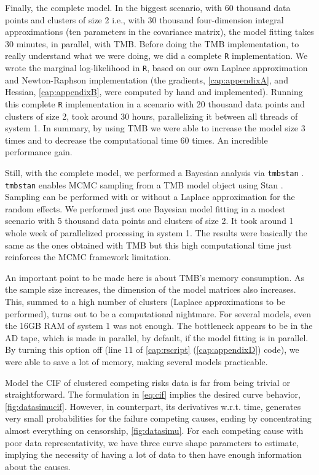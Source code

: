 Finally, the complete model. In the biggest scenario, with 60 thousand
data points and clusters of size 2 i.e., with 30 thousand four-dimension
integral approximations (ten parameters in the covariance matrix), the
model fitting takes 30 minutes, in parallel, with TMB. Before doing the
TMB implementation, to really understand what we were doing, we did a
complete \texttt{R} implementation. We wrote the marginal log-likelihood
in \texttt{R}, based on our own Laplace approximation \cite{patrao} and
Newton-Raphson implementation (the gradients, \autoref{cap:appendixA},
and Hessian, \autoref{cap:appendixB}, were computed by hand and
implemented). Running this complete \texttt{R} implementation in a
scenario with 20 thousand data points and clusters of size 2, took
around 30 hours, parallelizing it between all threads of system 1. In
summary, by using TMB we were able to increase the model size 3 times
and to decrease the computational time 60 times. An incredible
performance gain.

Still, with the complete model, we performed a Bayesian analysis via
\texttt{tmbstan} \cite{tmbstan}. \texttt{tmbstan} enables MCMC sampling
\cite{MCMC, Diaconis} from a TMB model object using Stan \cite{Stan,
RStan}. Sampling can be performed with or without a Laplace
approximation for the random effects. We performed just one Bayesian
model fitting in a modest scenario with 5 thousand data points and
clusters of size 2. It took around 1 whole week of parallelized
processing in system 1. The results were basically the same as the ones
obtained with TMB but this high computational time just reinforces the
MCMC framework limitation.

An important point to be made here is about TMB's memory consumption. As
the sample size increases, the dimension of the model matrices also
increases. This, summed to a high number of clusters (Laplace
approximations to be performed), turns out to be a computational
nightmare. For several models, even the 16GB RAM of system 1 was not
enough. The bottleneck appears to be in the AD tape, which is made in
parallel, by default, if the model fitting is in parallel. By turning
this option off (line 11 of \autoref{cap:rscript}
(\autoref{cap:appendixD}) code), we were able to save a lot of memory,
making several models practicable.

Model the CIF of clustered competing risks data is far from being
trivial or straightforward. The formulation in \autoref{eq:cif} implies
the desired curve behavior, \autoref{fig:datasimucif}. However, in
counterpart, its derivatives w.r.t. time, generates very small
probabilities for the failure competing causes, ending by concentrating
almost everything on censorship, \autoref{fig:datasimu}. For each
competing cause with poor data representativity, we have three curve
shape parameters to estimate, implying the necessity of having a lot of
data to then have enough information about the causes.

